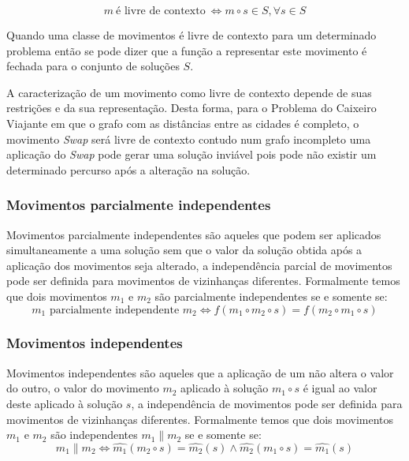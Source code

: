 \begin{equation} \label{eq:movimentoLivreDeContexto}
m \ \textrm{é livre de contexto} \  \iff m \circ s \in S, \forall s \in S
\end{equation}

Quando uma classe de movimentos é livre de contexto para um determinado problema então se pode dizer que a função a representar este movimento é fechada para o conjunto de soluções $S$.

A caracterização de um movimento como livre de contexto depende de suas restrições e da sua representação.
Desta forma, para o Problema do Caixeiro Viajante em que o grafo com as distâncias entre as cidades é completo, o movimento \textit{Swap} será livre de contexto contudo num grafo incompleto uma aplicação do \textit{Swap} pode gerar uma solução inviável pois pode não existir um determinado percurso após a alteração na solução.

\subsubsection{Movimentos parcialmente independentes} \label{subsubsec:movimentosParcialmenteIndependentes}

Movimentos parcialmente independentes são aqueles que podem ser aplicados simultaneamente a uma solução sem que o valor da solução obtida após a aplicação dos movimentos seja alterado, a independência parcial de movimentos pode ser definida para movimentos de vizinhanças diferentes.
Formalmente temos que dois movimentos $m_1$ e $m_2$ são parcialmente independentes se e somente se:
\begin{equation}
m_1 \textrm{ parcialmente independente } m_2 \iff f(m_1 \circ m_2 \circ s) = f(m_2 \circ m_1 \circ s) \label{eq:movimentosParcialmenteIndependentes}
\end{equation}

\subsubsection{Movimentos independentes} \label{subsubsec:movimentosIndependentes}

Movimentos independentes são aqueles que a aplicação de um não altera o valor do outro, o valor do movimento $m_2$ aplicado à solução $m_1 \circ s$ é igual ao valor deste aplicado à solução $s$, a independência de movimentos pode ser definida para movimentos de vizinhanças diferentes.
Formalmente temos que dois movimentos $m_1$ e $m_2$ são independentes $m_1 \parallel m_2$ se e somente se:
\begin{equation}
m_1 \parallel m_2 \iff \widehat{m_1}(m_2 \circ s) = \widehat{m_2}(s) \land \widehat{m_2}(m_1 \circ s) = \widehat{m_1}(s)
\end{equation}

